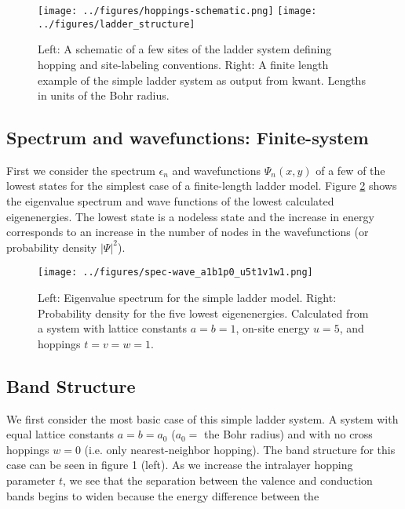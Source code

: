 \documentclass{article}
\begin{document}
\begin{figure}[ht]
    \centering
    \texttt{[image: ../figures/hoppings-schematic.png]}
    \texttt{[image: ../figures/ladder\_structure]}
    \caption{Left: A schematic of a few sites of the ladder system defining hopping and site-labeling conventions. Right: A finite length example of the simple ladder system as output from kwant. Lengths in units of the Bohr radius.}
    \label{fig:simple-ladder}
\end{figure}

\subsection{Spectrum and wavefunctions: Finite-system}
First we consider the spectrum $\epsilon_n$ and wavefunctions $\Psi_n(x,y)$ of a few of the lowest states for the simplest case of a finite-length ladder model. Figure \ref{fig:simple-spec-wave} shows the eigenvalue spectrum and wave functions of the lowest calculated eigenenergies. The lowest state is a nodeless state and the increase in energy corresponds to an increase in the number of nodes in the wavefunctions (or probability density $|\Psi|^2$).

\begin{figure}
    \centering
    \texttt{[image: ../figures/spec-wave\_a1b1p0\_u5t1v1w1.png]}
    \caption{Left: Eigenvalue spectrum for the simple ladder model. Right: Probability density for the five lowest eigenenergies. Calculated from a system with lattice constants $a=b=1$, on-site energy $u=5$, and hoppings $t=v=w=1$.}
    \label{fig:simple-spec-wave}
\end{figure}

\subsection{Band Structure}
We first consider the most basic case of this simple ladder system. A system with equal lattice constants $a = b = a_0$ ($a_0 = $ the Bohr radius) and with no cross hoppings $w = 0$ (i.e. only nearest-neighbor hopping). The band structure for this case can be seen in figure 1 (left). As we increase the intralayer hopping parameter $t$, we see that the separation between the valence and conduction bands begins to widen because the energy difference between the 
\end{document}
